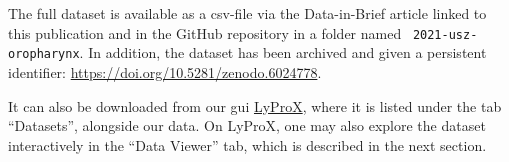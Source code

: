 \begin{tcolorbox}[
    title=\faIcon{database} Data,
    parbox=false,
    float
]
    The full dataset is available as a \acrshort{csv}-file via the Data-in-Brief article linked to this publication \cite{ludwig_dataset_2022} and in the GitHub repository  in a folder named ~\texttt{2021-usz-oropharynx}. In addition, the dataset has been archived and given a persistent identifier: \url{https://doi.org/10.5281/zenodo.6024778}.

    It can also be downloaded from our \gls{gui} \href{https://lyprox.org}{ LyProX}, where it is listed under the tab ``Datasets'', alongside our data. On LyProX, one may also explore the dataset interactively in the ``Data Viewer'' tab, which is described in the next section.
\end{tcolorbox}
